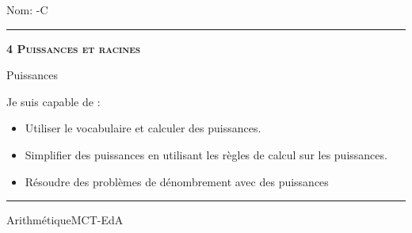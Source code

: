 \documentclass[11pt,a4paper]{article}
\begin{document}
\begin{titlepage}
    \setlength{\topskip}{0mm}
Nom: \hfill \the\year-C
\vspace{0.5cm}
\hrule

    \centering
    \vspace{0.1\textheight}
	{\bfseries\scshape\Huge 4 Puissances et racines\par}
    \vspace{1.5cm}

    {\huge Puissances}
	\vspace{1.5cm}
    
    {\large Je suis capable de :}
    \vspace{1.5cm}
    \begin{itemize}
\item Utiliser le vocabulaire et calculer des puissances.
\item Simplifier des puissances en utilisant les règles de calcul sur les puissances.
\item Résoudre des problèmes de dénombrement avec des puissances\end{itemize}

\vfill
\hrule
\vspace{0.5cm}
Arithmétique\hfill MCT-EdA

\end{titlepage}
\end{document}
